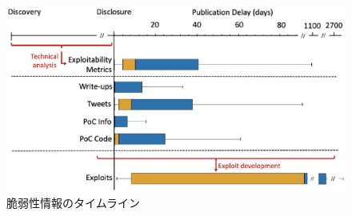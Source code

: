 \documentclass[submit,techreq,noauthor]{eco}	%
\begin{document}
\begin{figure}[H]
  \centering
  \includegraphics[scale=0.38]{fig/pic1.eps}
  \caption{脆弱性情報のタイムライン}
\end{figure}
\end{document}
